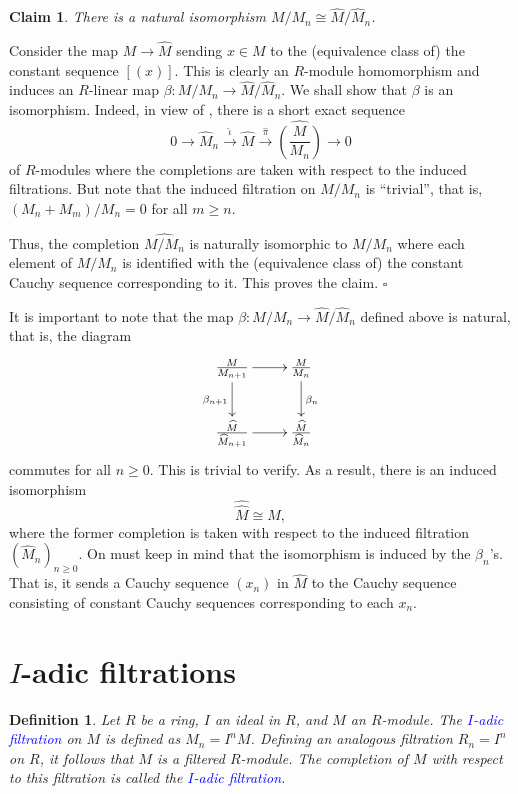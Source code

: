 \documentclass[11pt]{article}
\theoremstyle{thmstyle}
\theoremstyle{defstyle}
\newtheorem{definition}[theorem]{Definition}
\newtheorem*{claim}{Claim}
\newcommand{\wh}[1]{\widehat{#1}}
\newcommand{\define}[1]{\textcolor{blue}{\textit{#1}}}
\renewcommand{\ge}{\geqslant}
\begin{document}
\begin{claim}
    There is a natural isomorphism $M/M_n\cong\wh M/\wh M_n$.
\end{claim}
Consider the map $M\to\wh M$ sending $x\in M$ to the (equivalence class of) the constant sequence $[(x)]$. This is clearly an $R$-module homomorphism and induces an $R$-linear map $\beta\colon M/M_n\to\wh M/\wh M_n$. We shall show that $\beta$ is an isomorphism. Indeed, in view of , there is a short exact sequence 
\begin{equation*}
    0\to\wh M_n\xrightarrow{\wh\iota}\wh M\xrightarrow{\wh\pi}\wh{\left(\frac{M}{M_n}\right)}\to 0
\end{equation*}
of $R$-modules where the completions are taken with respect to the induced filtrations. But note that the induced filtration on $M/M_n$ is ``trivial'', that is, $(M_n + M_m)/M_n = 0$ for all $m\ge n$. 

Thus, the completion $\wh{M/M_n}$ is naturally isomorphic to $M/M_n$ where each element of $M/M_n$ is identified with the (equivalence class of) the constant Cauchy sequence corresponding to it. This proves the claim. $\square$

It is important to note that the map $\beta\colon M/M_n\to\wh M/\wh M_n$ defined above is natural, that is, the diagram 
\begin{equation*}
    \xymatrix {
        \frac{M}{M_{n + 1}}\ar[r]\ar[d]_{\beta_{n + 1}} & \frac{M}{M_n}\ar[d]^{\beta_n}\\
        \frac{\wh M}{\wh M_{n + 1}}\ar[r] & \frac{\wh M}{\wh M_n}
    }
\end{equation*}
commutes for all $n\ge 0$. This is trivial to verify. As a result, there is an induced isomorphism 
\begin{equation*}
    \wh{\wh M}\cong\wh M,
\end{equation*}
where the former completion is taken with respect to the induced filtration $(\wh M_n)_{n\ge 0}$. On must keep in mind that the isomorphism is induced by the $\beta_n$'s. That is, it sends a Cauchy sequence $(x_n)$ in $\wh M$ to the Cauchy sequence consisting of constant Cauchy sequences corresponding to each $x_n$.

\section{\texorpdfstring{$I$}{I}-adic filtrations}

\begin{definition}
    Let $R$ be a ring, $I$ an ideal in $R$, and $M$ an $R$-module. The \define{$I$-adic filtration} on $M$ is defined as $M_n = I^n M$. Defining an analogous filtration $R_n = I^n$ on $R$, it follows that $M$ is a filtered $R$-module. The completion of $M$ with respect to this filtration is called the \define{$I$-adic filtration}.
\end{definition}
\end{document}
